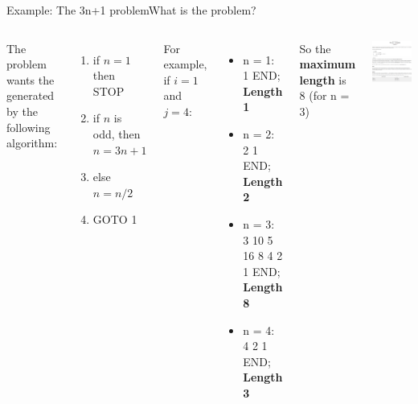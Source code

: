 \begin{frame}{Example: The 3n+1 problem}{What is the problem?}
  \begin{columns}
    {\smaller
    The problem wants the  generated by the following algorithm:
      \begin{enumerate}
        \item if $n = 1$ then STOP
        \item if $n$ is odd, then $n = 3n + 1$
        \item else $n = n/2$
        \item GOTO 1
      \end{enumerate}
    \medskip

    For example, if $i = 1$ and $j = 4$:
    \begin{itemize}
      \item n = 1: 1 END; {\bf Length 1}
      \item n = 2: 2 1 END; {\bf Length 2}
      \item n = 3: 3 10 5 16 8 4 2 1 END; {\bf Length 8}
      \item n = 4: 4 2 1 END; {\bf Length 3}
    \end{itemize}
    So the {\bf maximum length} is 8 (for n = 3)}
    \includegraphics[width=1\textwidth]{img/3n_problem}
  \end{columns}
\end{frame}

